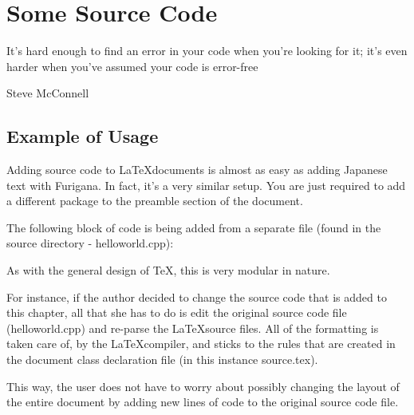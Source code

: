\chapter{Some Source Code}
\epigraph{It's hard enough to find an error in your code when you're looking for it; it's even harder when you've assumed your code is error-free}{Steve McConnell}


\section{Example of Usage}
Adding source code to \LaTeX documents is almost as easy as adding Japanese text with Furigana. In fact, it's a very similar setup. You are just required to add a different package to the preamble section of the document.
\par The following block of code is being added from a separate file (found in the source directory - helloworld.cpp):

\lstset{numbers=left, stepnumber=1, language=C++}



As with the general design of \TeX, this is very modular in nature.
\par For instance, if the author decided to change the source code that is added to this chapter, all that she has to do is edit the original source code file (helloworld.cpp) and re-parse the \LaTeX source files. All of the formatting is taken care of, by the \LaTeX compiler, and sticks to the rules that are created in the document class declaration file (in this instance source.tex).
\par This way, the user does not have to worry about possibly changing the layout of the entire document by adding new lines of code to the original source code file.
